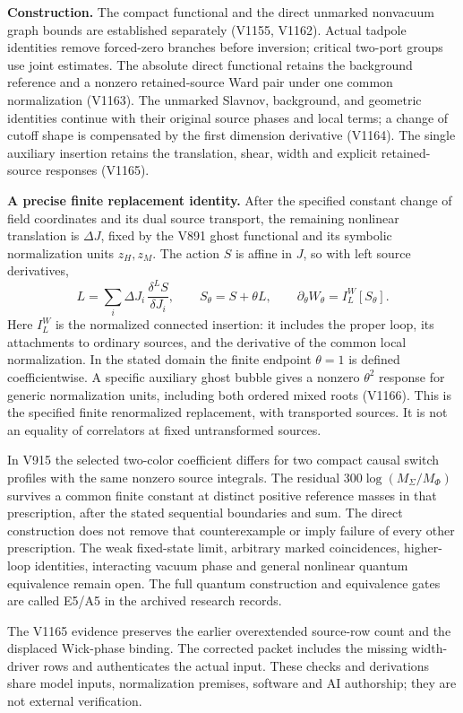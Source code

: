 \documentclass[10pt,letterpaper]{article}
\newcommand{\sect}[1]{\vspace{5pt}{\large\bfseries\color{ink}#1}\par}
\begin{document}
\textbf{Construction.} The compact functional and the direct unmarked
nonvacuum graph bounds are established separately (V1155, V1162).
Actual tadpole identities remove forced-zero branches before inversion;
critical two-port groups use joint estimates. The absolute direct functional
retains the background reference and a nonzero retained-source Ward pair
under one common normalization (V1163). The unmarked Slavnov, background,
and geometric identities continue with their original source phases and
local terms; a change of cutoff shape is compensated by the first dimension
derivative (V1164). The single auxiliary insertion retains the translation,
shear, width and explicit retained-source responses (V1165).

\textbf{A precise finite replacement identity.} After the specified constant
change of field coordinates and its dual source transport, the remaining
nonlinear translation is $\Delta J$, fixed by the V891 ghost functional
and its symbolic normalization units $z_H,z_M$.
The action $S$ is affine in $J$, so with left source derivatives,
\[
L=\sum_i\Delta J_i\,\frac{\delta^L S}{\delta J_i},\qquad
S_\theta=S+\theta L,\qquad
\partial_\theta W_\theta=I^W_L[S_\theta].
\]
Here $I^W_L$ is the normalized connected insertion: it includes the
proper loop, its attachments to ordinary sources, and the derivative
of the common local normalization. In the stated domain the finite
endpoint $\theta=1$ is defined coefficientwise. A specific auxiliary
ghost bubble gives a nonzero $\theta^2$ response for generic normalization
units, including both ordered mixed roots (V1166). This is the specified
finite renormalized replacement, with transported sources. It is not an
equality of correlators at fixed untransformed sources.

\sect{A separate counterexample and remaining limits}
In V915 the selected two-color coefficient differs for two compact causal
switch profiles with the same nonzero source integrals. The residual
$300\log(M_\Sigma/M_\Phi)$ survives a common finite constant at distinct
positive reference masses in that prescription, after the stated
sequential boundaries and sum. The direct construction does not remove
that counterexample or imply failure of every other prescription.
The weak fixed-state limit, arbitrary marked coincidences, higher-loop
identities, interacting vacuum phase and general nonlinear quantum
equivalence remain open. The full quantum construction and equivalence
gates are called E5/A5 in the archived research records.

The V1165 evidence preserves the earlier overextended source-row count
and the displaced Wick-phase binding. The corrected packet includes
the missing width-driver rows and authenticates the actual input.
These checks and derivations share model inputs, normalization premises,
software and AI authorship; they are not external verification.
\end{document}
